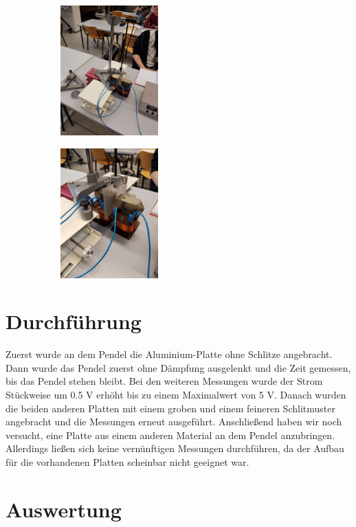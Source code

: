 \begin{figure}
  \centering
  \begin{subfigure}{0.48\textwidth}
    \includegraphics[height=5cm, angle = -90]{20170306_101228.jpg}
  \end{subfigure}
\begin{subfigure}{0.48\textwidth}
    \includegraphics[height=5cm, angle = -90]{20170306_101230.jpg}
  \end{subfigure}
\end{figure}

\section{Durchführung}

Zuerst wurde an dem Pendel die Aluminium-Platte ohne Schlitze angebracht. Dann
wurde das Pendel zuerst ohne Dämpfung ausgelenkt und die Zeit gemessen, bis das
Pendel stehen bleibt. Bei den weiteren Messungen wurde der Strom Stückweise um
0.5 V erhöht bis zu einem Maximalwert von 5 V. Danach wurden die beiden anderen
Platten mit einem groben und einem feineren Schlitmuster angebracht und die Messungen
erneut ausgeführt.
Anschließend haben wir noch versucht, eine Platte aus einem anderen Material an
dem Pendel anzubringen. Allerdings ließen sich keine vernünftigen Messungen
durchführen, da der Aufbau für die vorhandenen Platten scheinbar nicht geeignet
war.



\section{Auswertung}

